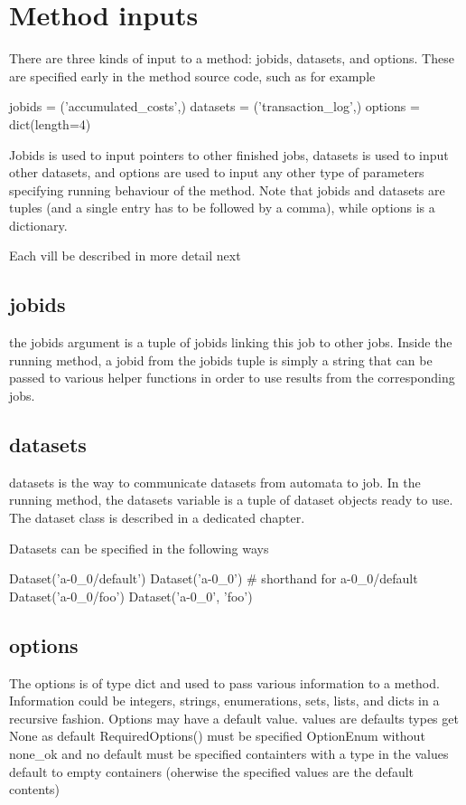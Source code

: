 \section{Method inputs}

There are three kinds of input to a method:  jobids, datasets, and options.
These are specified early in the method source code, such as for example

\begin{python}
jobids = ('accumulated_costs',)
datasets = ('transaction_log',)
options = dict(length=4)
\end{python}

Jobids is used to input pointers to other finished jobs, datasets is
used to input other datasets, and options are used to input any other
type of parameters specifying running behaviour of the method.  Note
that jobids and datasets are tuples (and a single entry has to be
followed by a comma), while options is a dictionary.

Each vill be described in more detail next



\subsection{jobids}
the jobids argument is a tuple of jobids linking this job to other
jobs.  Inside the running method, a jobid from the jobids tuple is
simply a string that can be passed to various helper functions in
order to use results from the corresponding jobs.



\subsection{datasets}
datasets is the way to communicate datasets from automata to job.  In
the running method, the datasets variable is a tuple of dataset
objects ready to use.  The dataset class is described in a dedicated
chapter.

Datasets can be specified in the following ways

\begin{python}
Dataset('a-0_0/default')
Dataset('a-0_0')          # shorthand for a-0_0/default
Dataset('a-0_0/foo')
Dataset('a-0_0', 'foo')
\end{python}



\subsection*{options}
The options is of type dict and used to pass various information to a
method.  Information could be integers, strings, enumerations, sets,
lists, and dicts in a recursive fashion.  Options may have a default
value.
values are defaults
types get None as default
RequiredOptions() must be specified
OptionEnum without none\_ok and no default must be specified
containters with a type in the values default to empty containers
(oherwise the specified values are the default contents)




